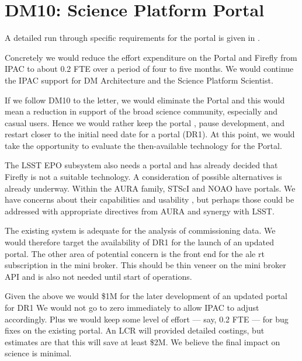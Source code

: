 \section{DM10: Science Platform Portal}\label{sect:dm10}

A detailed run through specific requirements for the portal is given in .

Concretely we would reduce the effort expenditure on the Portal and Firefly from IPAC to about 0.2 FTE over a period of four to five months.
We would continue the IPAC support for DM Architecture and the Science Platform Scientist.

If we follow DM10 to the letter, we would eliminate the Portal and this would mean a reduction in support of the broad science community, 
especially   and casual users.
Hence we would rather keep the portal  , pause development, and  restart closer 
to the initial need date for a portal (DR1).
At this point, we would take the opportunity to evaluate the then-available technology for the Portal.

The LSST EPO subsystem also needs a portal and has already decided that
Firefly is not a suitable technology. A consideration of possible alternatives
is already underway.
Within the AURA family, STScI and NOAO have portals.
We have concerns about their capabilities and usability
,
but perhaps those could be addressed with appropriate directives from AURA and synergy with LSST.

The existing system is adequate for the analysis of commissioning data.
We would therefore target the availability of DR1 for the launch of an updated
portal.
The other area of potential concern is the front end for the ale	rt subscription in the mini broker.
This should be  thin veneer on the mini broker API and is also not needed until start of operations.

Given the above we would  \$1M for the later development of an updated portal for DR1
We would not go to zero immediately to allow IPAC to adjust accordingly.
Plus we would keep some level of effort --- say, 0.2 FTE --- for bug fixes on the existing portal.
An LCR will provided detailed costings, but   estimates are that this will save at least \$2M.
We believe the final impact on science is minimal.

